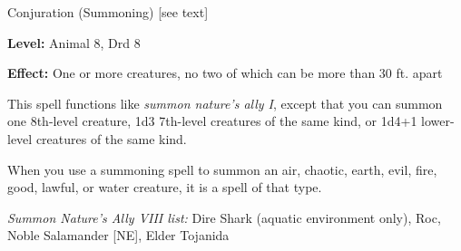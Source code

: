 
Conjuration (Summoning) [see text]

\textbf{Level:} Animal 8, Drd 8

\textbf{Effect:} One or more creatures, no two of which can be more than 30 ft. 
apart

This spell functions like \textit{summon nature's ally I}, except that you can 
summon one 8th-level creature, 1d3 7th-level creatures of the same kind, or 1d4+1 
lower-level creatures of the same kind.

When you use a summoning spell to summon an air, chaotic, earth, evil, fire, good, 
lawful, or water creature, it is a spell of that type.

\textit{Summon Nature's Ally VIII list:} Dire Shark (aquatic environment only), Roc, Noble Salamander [NE], Elder Tojanida
